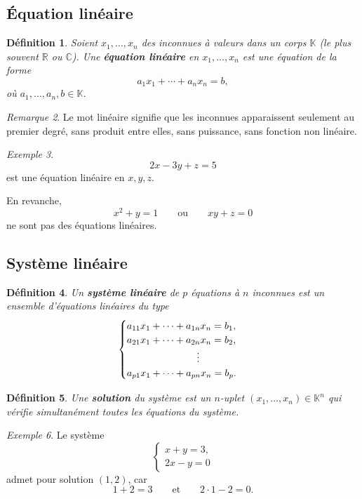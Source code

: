 \documentclass[11pt,a4paper]{article}
\newtheorem{definition}{Définition}[section]
\theoremstyle{remark}
\newtheorem{remarque}[definition]{Remarque}
\newtheorem{exemple}[definition]{Exemple}
\newcommand{\R}{\mathbb{R}}
\newcommand{\C}{\mathbb{C}}
\newcommand{\K}{\mathbb{K}}
\begin{document}
\subsection{Équation linéaire}

\begin{definition}
Soient \(x_1,\dots,x_n\) des inconnues à valeurs dans un corps \(\K\) (le plus souvent \(\R\) ou \(\C\)).  
Une \textbf{équation linéaire} en \(x_1,\dots,x_n\) est une équation de la forme
\[
a_1x_1+\cdots+a_nx_n=b,
\]
où \(a_1,\dots,a_n,b\in\K\).
\end{definition}

\begin{remarque}
Le mot \og linéaire \fg{} signifie que les inconnues apparaissent seulement au premier degré, sans produit entre elles, sans puissance, sans fonction non linéaire.
\end{remarque}

\begin{exemple}
\[
2x-3y+z=5
\]
est une équation linéaire en \(x,y,z\).

En revanche,
\[
x^2+y=1
\qquad \text{ou} \qquad
xy+z=0
\]
ne sont pas des équations linéaires.
\end{exemple}

\subsection{Système linéaire}

\begin{definition}
Un \textbf{système linéaire} de \(p\) équations à \(n\) inconnues est un ensemble d’équations linéaires du type
\[
\begin{cases}
a_{11}x_1+\cdots+a_{1n}x_n=b_1,\\
a_{21}x_1+\cdots+a_{2n}x_n=b_2,\\
\hspace{2.5cm}\vdots\\
a_{p1}x_1+\cdots+a_{pn}x_n=b_p.
\end{cases}
\]
\end{definition}

\begin{definition}
Une \textbf{solution} du système est un \(n\)-uplet \((x_1,\dots,x_n)\in\K^n\) qui vérifie simultanément toutes les équations du système.
\end{definition}

\begin{exemple}
Le système
\[
\begin{cases}
x+y=3,\\
2x-y=0
\end{cases}
\]
admet pour solution \((1,2)\), car
\[
1+2=3
\qquad \text{et} \qquad
2\cdot 1-2=0.
\]
\end{exemple}
\end{document}
